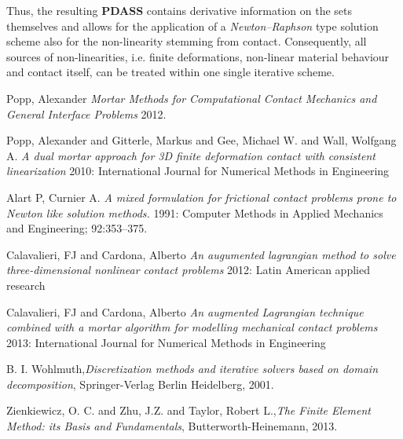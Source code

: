 \documentclass[a4paper,10pt]{article} %
\begin{document}
Thus, the resulting \textbf{PDASS} contains derivative information on the sets themselves and allows for the application of a \textit{Newton–Raphson} type solution scheme also for the non-linearity stemming from contact. Consequently, all sources of non-linearities, i.e. finite deformations, non-linear material behaviour and contact itself, can be treated
within one single iterative scheme.

\begin{thebibliography}{99}

 Popp, Alexander {\em Mortar Methods for Computational Contact Mechanics and General Interface Problems}  2012.

  Popp, Alexander and Gitterle, Markus and Gee, Michael W. and Wall, Wolfgang A. {\em A dual mortar approach for 3D finite deformation contact with consistent linearization} 2010: International Journal for Numerical Methods in Engineering

   Alart P, Curnier A.  {\em A mixed formulation for frictional contact problems prone to Newton like solution methods.} 1991: Computer Methods in Applied Mechanics and Engineering; 92:353–375.

  Calavalieri, FJ and Cardona, Alberto {\em An augumented lagrangian method to solve three-dimensional nonlinear contact problems} 2012: Latin American applied research

  Calavalieri, FJ and Cardona, Alberto {\em An augmented Lagrangian technique combined with a mortar algorithm for modelling mechanical contact problems} 2013: International Journal for Numerical Methods in Engineering

 B. I. Wohlmuth,{\em Discretization methods and iterative solvers based on domain decomposition}, Springer-Verlag Berlin Heidelberg, 2001.

 Zienkiewicz, O. C. and Zhu, J.Z. and Taylor, Robert L.,{\em The Finite Element Method: its Basis and Fundamentals}, Butterworth-Heinemann, 2013.

\end{thebibliography}
\end{document}
